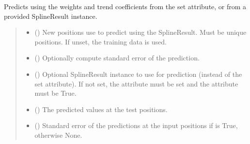 \documentclass[letterpaper,10pt,english]{sphinxmanual}
\begin{document}
\begin{fulllineitems}
\begin{fulllineitems}
\sphinxAtStartPar
Predicts using the weights and trend coefficients from the set 
attribute, or from a provided SplineResult instance.
\begin{quote}\begin{description}
\begin{itemize}
\item {}
\sphinxAtStartPar
{} () \textendash{} New positions use to predict using the SplineResult. Must be unique
positions. If unset, the training data is used.

\item {}
\sphinxAtStartPar
{} () \textendash{} Optionally compute standard error of the prediction.

\item {}
\sphinxAtStartPar
{} () \textendash{} Optional SplineResult instance to use for prediction (instead of the
set  attribute). If not set, the  attribute must be
set and the  attribute must be True.

\end{itemize}

\sphinxAtStartPar
{}

\sphinxAtStartPar
\begin{itemize}
\item {}
\sphinxAtStartPar
{} () \textendash{} The predicted values at the test positions.

\item {}
\sphinxAtStartPar
{} () \textendash{} Standard error of the predictions at the input positions if
 is True, otherwise None.


\end{itemize}
\end{description}
\end{quote}
\end{fulllineitems}
\end{fulllineitems}
\end{document}
